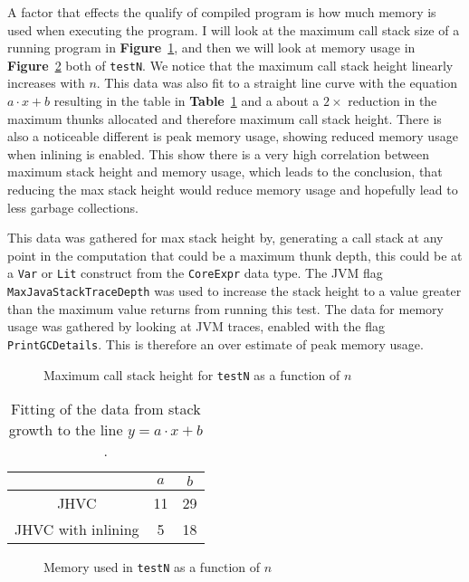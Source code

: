 \documentclass[float=false, crop=false]{standalone}
\newlength\gwidth
\newlength\gheight
\newcommand{\namefig}{\textbf{Figure}~}
\newcommand{\nametable}{\textbf{Table}~}
\newcommand{\importMGraph}[3]{\setlength{\gwidth}{#2}\setlength{\gheight}{#3}{#1}}
\begin{document}
A factor that effects the qualify of compiled program is how much memory
is used when executing the program. I will look at the maximum call stack size
of a running program in \namefig\ref{plot:stackSize}, and then we will look at memory usage in 
\namefig\ref{plot:memUsed} both of \texttt{testN}. 
We notice that the maximum call stack height linearly increases with $n$. 
This data was also fit to a straight line curve
with the equation $a\cdot x + b$ resulting in the table in \nametable\ref{table:stackGrowth} 
and a about a $2\times$ reduction in the maximum thunks allocated and therefore
maximum call stack height. There is also a noticeable different is peak memory usage, 
showing reduced memory usage when inlining is enabled.
This show there is a very high correlation between maximum
stack height and memory usage, which leads to the conclusion, that reducing the 
max stack height would reduce memory usage and hopefully lead to less garbage collections.

This data was gathered for max stack height by, 
generating a call stack at any point in the computation that could 
be a maximum thunk depth, this could be at a \texttt{Var} or \texttt{Lit} construct from
the \texttt{CoreExpr} data type. The JVM flag \texttt{MaxJavaStackTraceDepth} was used to increase
the stack height to a value greater than the maximum value returns from running this test.
The data for memory usage was gathered by looking at JVM traces, 
enabled with the flag \texttt{PrintGCDetails}. This is therefore an over estimate of
peak memory usage. 

\begin{figure}
  \centering
  \importMGraph{plotCallStackGrowth}{0.96\textwidth}{0.3\textwidth}
  \caption{Maximum call stack height for \texttt{testN} as a function of $n$}
  \label{plot:stackSize}
\end{figure}

\begin{table}
  \centering
  \begin{tabular}{ c | c c}
  & $a$ & $b$\\
  \hline
  JHVC & 11 & 29 \\
  JHVC with inlining & 5 & 18 
  \end{tabular}
  \caption{Fitting of the data from stack growth to the line $y = a\cdot x + b$.}
  \label{table:stackGrowth}
\end{table}


\begin{figure}
  \centering
  \importMGraph{memUsed}{0.96\textwidth}{0.3\textwidth}
  \caption{Memory used in \texttt{testN} as a function of $n$}
  \label{plot:memUsed}
\end{figure}
\end{document}
